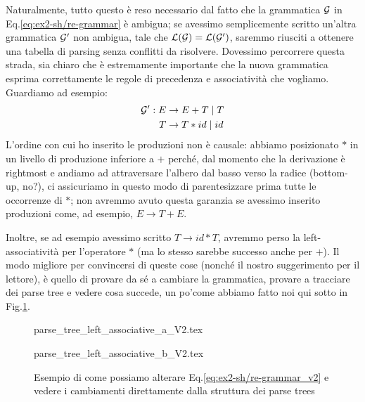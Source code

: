 \documentclass[class=book, crop=false, oneside, 12pt]{standalone}
\begin{document}
Naturalmente, tutto questo è reso necessario dal fatto che la grammatica \(\mathcal{G}\) in Eq.\ref{eq:ex2-sh/re-grammar} è ambigua; se avessimo semplicemente scritto un'altra grammatica \(\mathcal{G}'\) non ambigua, tale che \(\mathcal{L}(\mathcal{G}) = \mathcal{L}(\mathcal{G}')\), saremmo riusciti a ottenere una tabella di parsing senza conflitti da risolvere. Dovessimo percorrere questa strada, sia chiaro che è estremamente importante che la nuova grammatica esprima correttamente le regole di precedenza e associatività che vogliamo. Guardiamo ad esempio:
\begin{align}
    \label{eq:ex2-sh/re-grammar_v2}
    \mathcal{G}': E &\to E + T \mid T \\
    T &\to T * id \mid id \notag
\end{align}
L'ordine con cui ho inserito le produzioni non è causale: abbiamo posizionato \(*\) in un livello di produzione inferiore a \(+\) perché, dal momento che la derivazione è rightmost e andiamo ad attraversare l'albero dal basso verso la radice (bottom-up, no?), ci assicuriamo in questo modo di parentesizzare prima tutte le occorrenze di \(\ast\); non avremmo avuto questa garanzia se avessimo inserito produzioni come, ad esempio, \(E \to T + E\). 

Inoltre, se ad esempio avessimo scritto \(T \to id * T\), avremmo perso la left-associatività per l'operatore \(\ast\) (ma lo stesso sarebbe successo anche per \(+\)). Il modo migliore per convincersi di queste cose (nonché il nostro suggerimento per il lettore), è quello di provare da sé a cambiare la grammatica, provare a tracciare dei parse tree e vedere cosa succede, un po'come abbiamo fatto noi qui sotto in Fig.\ref{fig:ex2-sh_re-altgrm-ptree}.
\begin{figure}[H]
    \begin{minipage}[b]{.4\textwidth}
        \centering
        {parse_tree_left_associative_a_V2.tex}
        \label{fig:ex2-sh_re-altgrm-ptree_1}
    \end{minipage}
    \hfill
    \begin{minipage}[b]{.4\textwidth}
        \centering
        {parse_tree_left_associative_b_V2.tex}
        \label{fig:ex2-sh_re-altgrm-ptree_2}
    \end{minipage}
    \caption{Esempio di come possiamo alterare Eq.\ref{eq:ex2-sh/re-grammar_v2} e vedere i cambiamenti direttamente dalla struttura dei parse trees}
    \label{fig:ex2-sh_re-altgrm-ptree}
\end{figure}
\end{document}
